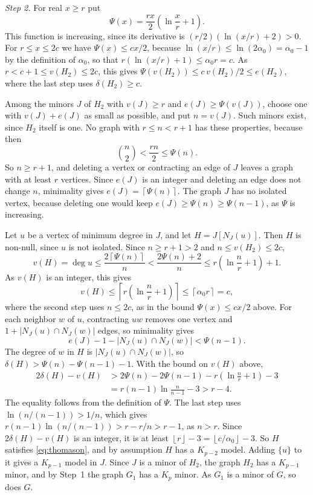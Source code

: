 \documentclass[11pt]{article}
\newcommand{\floor}[1]{\left\lfloor#1\right\rfloor}
\newcommand{\ceil}[1]{\left\lceil#1\right\rceil}
\begin{document}
\emph{Step 2.} For real $x\ge r$ put
\begin{equation*}
 \Psi(x)=\frac{rx}{2}\left(\ln\frac xr+1\right).
\end{equation*}
This function is increasing, since its derivative is
$(r/2)(\ln(x/r)+2)>0$. For $r\le x\le2c$ we have $\Psi(x)\le cx/2$, because
$\ln(x/r)\le\ln(2\alpha_0)=\alpha_0-1$ by the definition of $\alpha_0$, so
that $r(\ln(x/r)+1)\le\alpha_0r=c$. As $r<c+1\le v(H_2)\le2c$, this gives
$\Psi(v(H_2))\le c\,v(H_2)/2\le e(H_2)$, where the last step uses
$\delta(H_2)\ge c$.

Among the minors $J$ of $H_2$ with $v(J)\ge r$ and $e(J)\ge\Psi(v(J))$,
choose one with $v(J)+e(J)$ as small as possible, and put $n=v(J)$. Such
minors exist, since $H_2$ itself is one. No graph
with $r\le n<r+1$ has these properties, because then
\begin{equation*}
 \binom n2<\frac{rn}{2}\le\Psi(n).
\end{equation*}
So $n\ge r+1$, and deleting a vertex or contracting an edge of $J$ leaves a
graph with at least $r$ vertices. Since $e(J)$ is an integer and deleting an
edge does not change $n$, minimality gives $e(J)=\ceil{\Psi(n)}$. The graph $J$ has no isolated vertex, because
deleting one would keep $e(J)\ge\Psi(n)\ge\Psi(n-1)$, as $\Psi$ is
increasing.

Let $u$ be a vertex of minimum degree in $J$, and let $H=J[N_J(u)]$. Then $H$
is non-null, since $u$ is not isolated. Since $n\ge r+1>2$ and
$n\le v(H_2)\le2c$,
\begin{equation*}
 v(H)=\deg u\le\frac{2\ceil{\Psi(n)}}n
 <\frac{2\Psi(n)+2}{n}\le r\left(\ln\frac nr+1\right)+1.
\end{equation*}
As $v(H)$ is an integer, this gives
\begin{equation*}
 v(H)\le\ceil{r\left(\ln\frac nr+1\right)}
 \le\ceil{\alpha_0r}=c,
\end{equation*}
where the second step uses $n\le2c$, as in the bound $\Psi(x)\le cx/2$ above.
For each neighbor $w$ of $u$, contracting $uw$ removes one vertex and
$1+|N_J(u)\cap N_J(w)|$ edges, so minimality gives
\begin{equation*}
 e(J)-1-|N_J(u)\cap N_J(w)|<\Psi(n-1).
\end{equation*}
The degree of $w$ in $H$ is $|N_J(u)\cap N_J(w)|$, so
$\delta(H)>\Psi(n)-\Psi(n-1)-1$. With the bound on $v(H)$ above,
\begin{align*}
 2\delta(H)-v(H)
 &>2\Psi(n)-2\Psi(n-1)-r\left(\ln\frac nr+1\right)-3\\
 &=r(n-1)\ln\frac n{n-1}-3>r-4.
\end{align*}
The equality follows from the definition of $\Psi$. The last step uses
$\ln(n/(n-1))>1/n$, which gives $r(n-1)\ln(n/(n-1))>r-r/n>r-1$, as $n>r$.
Since $2\delta(H)-v(H)$ is an integer, it is at least
$\floor r-3=\floor{c/\alpha_0}-3$. So $H$ satisfies \eqref{eq:thomason}, and
by assumption $H$ has a $K_{p-2}$ model. Adding $\{u\}$ to it gives a
$K_{p-1}$ model in $J$. Since $J$ is a minor of $H_2$, the graph $H_2$ has a
$K_{p-1}$ minor, and by Step~1 the graph $G_1$ has a $K_p$ minor. As $G_1$ is
a minor of $G$, so does $G$.
\end{document}
